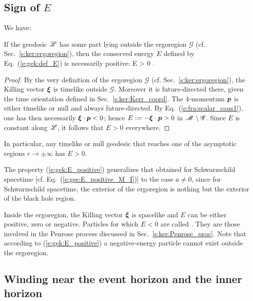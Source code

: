 \subsection{Sign of $E$}

We have:
\begin{greybox}
If the geodesic $\mathscr{L}$ has some part lying outside the ergoregion $\mathscr{G}$ (cf. Sec.~\ref{s:ker:ergoregion}),
then the conserved energy $E$ defined by Eq.~(\ref{e:gek:def_E}) is necessarily positive:
\be \label{e:gek:E_positive}
    \Li \not\subset {}\quad \Longrightarrow \quad E > 0 .
\ee
\end{greybox}
\begin{proof}
By the very definition of the ergoregion $\mathscr{G}$ (cf. Sec.~\ref{s:ker:ergoregion}),
the Killing vector $\bm{\xi}$ is timelike outside $\mathscr{G}$. Moreover it is
future-directed there, given the time orientation defined in Sec.~\ref{s:ker:Kerr_coord}.
The 4-momentum $\bm{p}$ is either timelike or null and always future-directed.
By Eq.~(\ref{e:fra:scalar_caus1}), one has then necessarily $\bm{\xi}\cdot\bm{p} < 0$; hence
$E := - \bm{\xi}\cdot\bm{p} > 0$ in $\mathscr{M}\setminus \mathscr{G}$. Since $E$ is constant along $\mathscr{L}$, it
follows that $E > 0$ everywhere.
\end{proof}
In particular, any timelike or null geodesic that reaches one of the asymptotic regions
$r\to\pm\infty$ has $E>0$.
\begin{remark}
The property (\ref{e:gek:E_positive}) generalizes that obtained for Schwarzschild spacetime [cf. Eq.~(\ref{e:ges:E_positive_M_I})] to
the case $a\not=0$, since for Schwarzschild spacetime, the exterior of the ergoregion
is nothing but the exterior of the black hole region.
\end{remark}

Inside the ergoregion, the Killing vector $\bm{\xi}$ is spacelike and $E$ can be
either positive, zero or negative. Particles for which $E<0$ are called
. They are those involved in the Penrose process discussed in Sec.~\ref{s:ker:Penrose_proc}.
Note that according to (\ref{e:gek:E_positive}) a negative-energy particle cannot exist
outside the ergoregion.

\subsection{Winding near the event horizon and the inner horizon}


